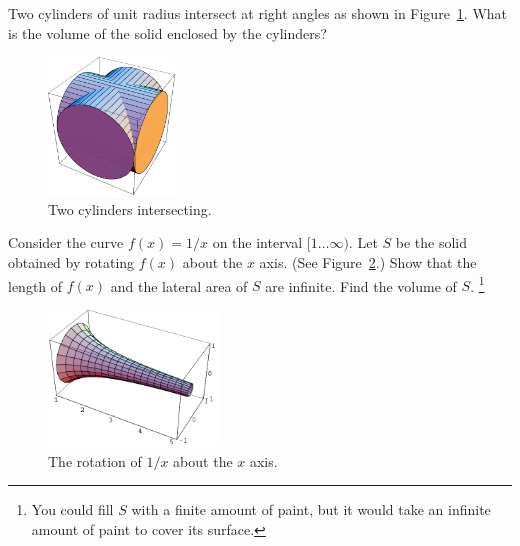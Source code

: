 \begin{Exercise}
  \label{exercise cylinder intersect}
  Two cylinders of unit radius intersect at right angles as shown in 
  Figure~\ref{figure cylinder intersect}.  What is the volume of the solid
  enclosed by the cylinders?
  \begin{figure}[h!]
    \begin{center}
      \includegraphics[width=0.3\textwidth]{calculus/vector/cylinderintersect}
    \end{center}
    \caption{Two cylinders intersecting.}
    \label{figure cylinder intersect}
  \end{figure}

\end{Exercise}






\begin{Exercise}
  \label{exercise length area volume 1/x}
  Consider the curve $f(x) = 1/x$ on the interval $[1 \ldots \infty)$.  Let $S$ be
  the solid obtained by rotating $f(x)$ about the $x$ axis.  
  (See Figure~\ref{figure length area volume 1/x}.)
  Show that the length of $f(x)$ and the lateral area of $S$ are infinite.
  Find the volume of $S$.
  \footnote{You could fill $S$ with a finite amount of paint, but it would 
    take an infinite amount of paint to cover its surface.}
  \begin{figure}[h!]
    \begin{center}
      \includegraphics[width=0.4\textwidth]{calculus/vector/lav1x}
    \end{center}
    \caption{The rotation of $1/x$ about the $x$ axis.}
    \label{figure length area volume 1/x}
  \end{figure}

\end{Exercise}







